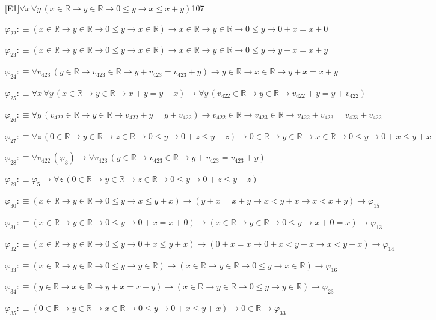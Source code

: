 \begin{fullproof}{[E1]}{$\forall x\,\forall y\,(x \in \mathbb{R} \to y \in \mathbb{R} \to 0 \leq y \to x \leq x + y)$}{107}
\begin{abbrevlist}
\item $\varphi_{22} :\equiv (x \in \mathbb{R} \to y \in \mathbb{R} \to 0 \leq y \to x \in \mathbb{R}) \to x \in \mathbb{R} \to y \in \mathbb{R} \to 0 \leq y \to 0 + x = x + 0$
\item $\varphi_{23} :\equiv (x \in \mathbb{R} \to y \in \mathbb{R} \to 0 \leq y \to x \in \mathbb{R}) \to x \in \mathbb{R} \to y \in \mathbb{R} \to 0 \leq y \to y + x = x + y$
\item $\varphi_{24} :\equiv \forall v_{423}\,(y \in \mathbb{R} \to v_{423} \in \mathbb{R} \to y + v_{423} = v_{423} + y) \to y \in \mathbb{R} \to x \in \mathbb{R} \to y + x = x + y$
\item $\varphi_{25} :\equiv \forall x\,\forall y\,(x \in \mathbb{R} \to y \in \mathbb{R} \to x + y = y + x) \to \forall y\,(v_{422} \in \mathbb{R} \to y \in \mathbb{R} \to v_{422} + y = y + v_{422})$
\item $\varphi_{26} :\equiv \forall y\,(v_{422} \in \mathbb{R} \to y \in \mathbb{R} \to v_{422} + y = y + v_{422}) \to v_{422} \in \mathbb{R} \to v_{423} \in \mathbb{R} \to v_{422} + v_{423} = v_{423} + v_{422}$
\item $\varphi_{27} :\equiv \forall z\,(0 \in \mathbb{R} \to y \in \mathbb{R} \to z \in \mathbb{R} \to 0 \leq y \to 0 + z \leq y + z) \to 0 \in \mathbb{R} \to y \in \mathbb{R} \to x \in \mathbb{R} \to 0 \leq y \to 0 + x \leq y + x$
\item $\varphi_{28} :\equiv \forall v_{422}\,(\varphi_{3}) \to \forall v_{423}\,(y \in \mathbb{R} \to v_{423} \in \mathbb{R} \to y + v_{423} = v_{423} + y)$
\item $\varphi_{29} :\equiv \varphi_{5} \to \forall z\,(0 \in \mathbb{R} \to y \in \mathbb{R} \to z \in \mathbb{R} \to 0 \leq y \to 0 + z \leq y + z)$
\item $\varphi_{30} :\equiv (x \in \mathbb{R} \to y \in \mathbb{R} \to 0 \leq y \to x \leq y + x) \to (y + x = x + y \to x < y + x \to x < x + y) \to \varphi_{15}$
\item $\varphi_{31} :\equiv (x \in \mathbb{R} \to y \in \mathbb{R} \to 0 \leq y \to 0 + x = x + 0) \to (x \in \mathbb{R} \to y \in \mathbb{R} \to 0 \leq y \to x + 0 = x) \to \varphi_{13}$
\item $\varphi_{32} :\equiv (x \in \mathbb{R} \to y \in \mathbb{R} \to 0 \leq y \to 0 + x \leq y + x) \to (0 + x = x \to 0 + x < y + x \to x < y + x) \to \varphi_{14}$
\item $\varphi_{33} :\equiv (x \in \mathbb{R} \to y \in \mathbb{R} \to 0 \leq y \to y \in \mathbb{R}) \to (x \in \mathbb{R} \to y \in \mathbb{R} \to 0 \leq y \to x \in \mathbb{R}) \to \varphi_{16}$
\item $\varphi_{34} :\equiv (y \in \mathbb{R} \to x \in \mathbb{R} \to y + x = x + y) \to (x \in \mathbb{R} \to y \in \mathbb{R} \to 0 \leq y \to y \in \mathbb{R}) \to \varphi_{23}$
\item $\varphi_{35} :\equiv (0 \in \mathbb{R} \to y \in \mathbb{R} \to x \in \mathbb{R} \to 0 \leq y \to 0 + x \leq y + x) \to 0 \in \mathbb{R} \to \varphi_{33}$
\end{abbrevlist}
\end{fullproof}

